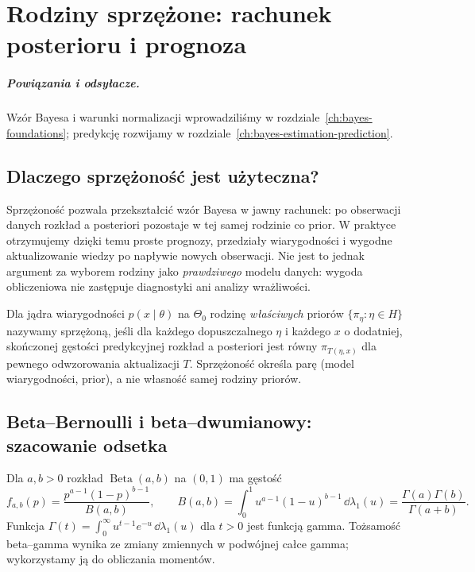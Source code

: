 \chapter{Rodziny sprzężone: rachunek posterioru i prognoza}
\label{ch:conjugate-families}
\paragraph{Powiązania i odsyłacze.} Wzór Bayesa i warunki normalizacji wprowadziliśmy w rozdziale~\ref{ch:bayes-foundations}; predykcję rozwijamy w rozdziale~\ref{ch:bayes-estimation-prediction}.


\section{Dlaczego sprzężoność jest użyteczna?}
Sprzężoność pozwala przekształcić wzór Bayesa w jawny rachunek:
po obserwacji danych rozkład a posteriori pozostaje w tej samej
rodzinie co prior. W praktyce otrzymujemy dzięki temu proste
prognozy, przedziały wiarygodności i wygodne aktualizowanie wiedzy
po napływie nowych obserwacji. Nie jest to jednak argument za
wyborem rodziny jako \emph{prawdziwego} modelu danych:
wygoda obliczeniowa nie zastępuje diagnostyki ani analizy wrażliwości.

\begin{definicja}
Dla jądra wiarygodności $p(x\mid\theta)$ na
$\Theta_0$ rodzinę \emph{właściwych} priorów
$\{\pi_\eta:\eta\in H\}$ nazywamy sprzężoną, jeśli dla
każdego dopuszczalnego $\eta$ i każdego $x$ o dodatniej,
skończonej gęstości predykcyjnej rozkład a posteriori jest
równy $\pi_{T(\eta,x)}$ dla pewnego odwzorowania aktualizacji
$T$. Sprzężoność określa parę (model wiarygodności, prior),
a nie własność samej rodziny priorów.
\end{definicja}

\section{Beta--Bernoulli i beta--dwumianowy: szacowanie odsetka}
\begin{definicja}
Dla $a,b>0$ rozkład $\operatorname{Beta}(a,b)$ na $(0,1)$
ma gęstość
\[
 f_{a,b}(p)=\frac{p^{a-1}(1-p)^{b-1}}{B(a,b)},
 \qquad B(a,b)=\int_0^1u^{a-1}(1-u)^{b-1}\,\dd\lambda_1(u)
 =\frac{\Gamma(a)\Gamma(b)}{\Gamma(a+b)}.
\]
Funkcja $\Gamma(t)=\int_0^\infty u^{t-1}e^{-u}\,\dd\lambda_1(u)$
dla $t>0$ jest funkcją gamma. Tożsamość beta--gamma wynika
ze zmiany zmiennych w podwójnej całce gamma; wykorzystamy
ją do obliczania momentów.
\end{definicja}

